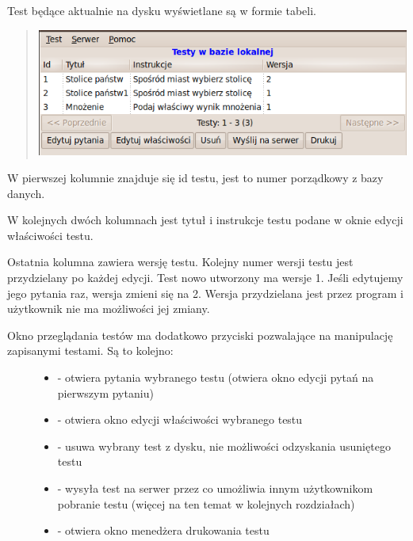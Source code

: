 \documentclass[letterpaper,10pt,polish]{sphinxmanual}
\begin{document}
Test będące aktualnie na dysku wyświetlane są w formie tabeli.
\begin{quote}

\includegraphics{TestyLokalnie.png}
\end{quote}

W pierwszej kolumnie znajduje się id testu, jest to numer porządkowy z bazy danych.

W kolejnych dwóch kolumnach jest tytuł i instrukcje testu podane w oknie edycji właściwości testu.

Ostatnia kolumna zawiera wersję testu. Kolejny numer wersji testu jest przydzielany po każdej edycji. Test nowo utworzony ma wersje 1. Jeśli edytujemy jego pytania raz, wersja zmieni się na 2. Wersja przydzielana jest przez program i użytkownik nie ma możliwości jej zmiany.
\begin{description}
\item[{Okno przeglądania testów ma dodatkowo przyciski pozwalające na manipulację zapisanymi testami. Są to kolejno:}] \leavevmode\begin{itemize}
\item {} 
 - otwiera pytania wybranego testu (otwiera okno edycji pytań na pierwszym pytaniu)

\item {} 
 - otwiera okno edycji właściwości wybranego testu

\item {} 
 - usuwa wybrany test z dysku, nie możliwości odzyskania usuniętego testu

\item {} 
 - wysyła test na serwer przez co umożliwia innym użytkownikom pobranie testu (więcej na ten temat w kolejnych rozdziałach)

\item {} 
 - otwiera okno menedżera drukowania testu

\end{itemize}

\end{description}
\end{document}
